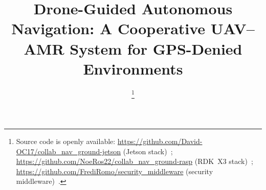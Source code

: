 \documentclass[conference]{IEEEtran}
\begin{document}
\title{Drone-Guided Autonomous Navigation: A Cooperative UAV--AMR System for
       GPS-Denied Environments}

\author{
    \thanks{Source code is openly available:
        \mbox{\url{https://github.com/David-OC17/collab_nav_ground-jetson}} (Jetson
        stack)~\cite{repo-jetson};
        \mbox{\url{https://github.com/NoeRos22/collab_nav_ground-rasp}} (RDK~X3
        stack)~\cite{repo-rasp};
        \mbox{\url{https://github.com/FrediRomo/security_middleware}} (security
        middleware)~\cite{repo-sec}.}
}

\maketitle
\end{document}
